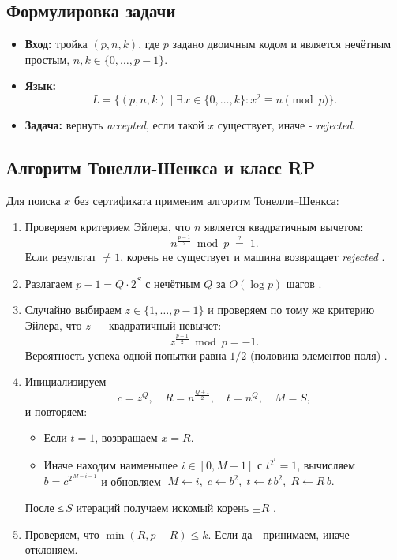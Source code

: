 \documentclass[a4paper,12pt]{article}
\begin{document}
\subsection{Формулировка задачи}

\begin{itemize}
  \item \textbf{Вход:} тройка \((p,n,k)\), где \(p\) задано двоичным кодом и является нечётным простым, \(n,k\in\{0,\dots,p-1\}\).
  \item \textbf{Язык:}
    \[
      L = \{(p,n,k)\mid \exists\,x\in\{0,\dots,k\}\colon x^2\equiv n\pmod p\}.
    \]
  \item \textbf{Задача:} вернуть \textit{accepted}, если такой \(x\) существует, иначе - \textit{rejected}.
\end{itemize}

\subsection{Алгоритм Тонелли-Шенкса и класс RP}

Для поиска \(x\) без сертификата применим алгоритм Тонелли–Шенкса:

\begin{enumerate}
  \item Проверяем критерием Эйлера, что \(n\) является квадратичным вычетом:
    \[
      n^{\frac{p-1}{2}}\!\bmod p \;\stackrel{?}{=}\;1.
    \]
    Если результат \(\neq1\), корень не существует и машина возвращает \textit{rejected} \cite{TonelliShanksWiki}.
  \item Разлагаем \(p-1 = Q\cdot 2^S\) с нечётным \(Q\) за \(O(\log p)\) шагов \cite{EulerCriterionWiki}.
  \item Случайно выбираем \(z\in\{1,\dots,p-1\}\) и проверяем по тому же критерию Эйлера, что \(z\) — квадратичный невычет:
    \[
      z^{\frac{p-1}{2}}\!\bmod p = -1.
    \]
    Вероятность успеха одной попытки равна \(1/2\) (половина элементов поля) \cite{RPWiki}.
  \item Инициализируем
    \[
      c=z^Q,\quad R=n^{\frac{Q+1}{2}},\quad t=n^Q,\quad M=S,
    \]
    и повторяем:
    \begin{itemize}
      \item Если \(t=1\), возвращаем \(x=R\).
      \item Иначе находим наименьшее \(i\in[0,M-1]\) с \(t^{2^i}=1\), вычисляем
        \(b=c^{2^{\,M-i-1}}\) и обновляем
        \(\;M\leftarrow i,\;c\leftarrow b^2,\;t\leftarrow t\,b^2,\;R\leftarrow R\,b.\)
    \end{itemize}
    После ≤ \(S\) итераций получаем искомый корень \(\pm R\) \cite{MenezesHAC}.
  \item Проверяем, что \(\min(R,p-R)\le k\). Если да - принимаем, иначе - отклоняем.
\end{enumerate}
\end{document}
